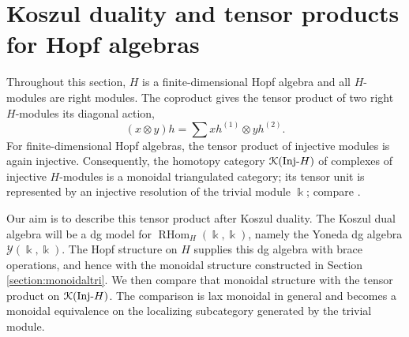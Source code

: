 \documentclass[a4paper, 11pt]{amsart}
\theoremstyle{definition}
\theoremstyle{remark}
\numberwithin{equation}{section}
\newcommand{\Y}{\mathcal{Y}}
\newcommand{\EK}{\EuScript{K}}
\begin{document}
\section{Koszul duality and tensor products for Hopf algebras}\label{section:koszulduality}
Throughout this section, $H$ is a finite-dimensional Hopf algebra and all $H$-modules are right modules. The coproduct gives the tensor product of two right $H$-modules its diagonal action,
\[
(x\otimes y)h=\sum xh^{(1)}\otimes yh^{(2)}.
\]
For finite-dimensional Hopf algebras, the tensor product of injective modules is again injective. Consequently, the homotopy category $\EK(\mathrm{Inj}\text{-}H)$ of complexes of injective $H$-modules is a monoidal triangulated category; its tensor unit is represented by an injective resolution of the trivial module $\Bbbk$; compare \cite{BeKr}.

Our aim is to describe this tensor product after Koszul duality. The Koszul dual algebra will be a dg model for $\operatorname{RHom}_H(\Bbbk,\Bbbk)$, namely the Yoneda dg algebra $\Y(\Bbbk,\Bbbk)$. The Hopf structure on $H$ supplies this dg algebra with brace operations, and hence with the monoidal structure constructed in Section \ref{section:monoidaltri}. We then compare that monoidal structure with the tensor product on $\EK(\mathrm{Inj}\text{-}H)$. The comparison is lax monoidal in general and becomes a monoidal equivalence on the localizing subcategory generated by the trivial module.
\end{document}
